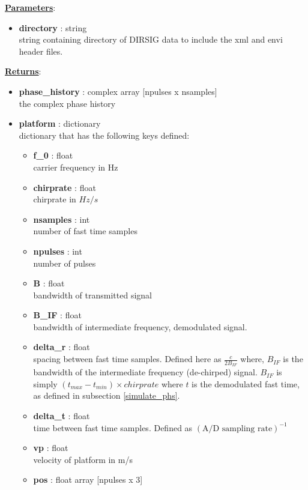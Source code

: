 \documentclass{article}
\newcommand{\defs}[2]{\textbf{{#1}} : {#2}}
\begin{document}
\noindent \underline{\textbf{Parameters}}:
\begin{itemize}
  	\item \defs{directory}{string}\\
  		string containing directory of DIRSIG data to include the xml and envi header files.
\end{itemize}
\noindent \underline{\textbf{Returns}}:
\begin{itemize}
	\item \defs{phase\_history}{complex array [npulses x nsamples]}\\
		the complex phase history
	  \item \defs{platform}{dictionary}\\
	  	dictionary that has the following keys defined:
	  \begin{itemize}
	    \item \defs{f\_0}{float}\\
	    	carrier frequency in Hz
		\item \defs{chirprate}{float}\\
		   	chirprate in $Hz/s$
	    \item \defs{nsamples}{int}\\
	    	number of fast time samples
	    \item \defs{npulses}{int}\\
	    	number of pulses
	    \item \defs{B}{float}\\
	    	bandwidth of transmitted signal
	    \item \defs{B\_IF}{float}\\
	    	bandwidth of intermediate frequency, demodulated signal.
	    \item \defs{delta\_r}{float}\\
       	   	spacing between fast time samples.  Defined here as $\frac{c}{2B_{IF}}$ where, $B_{IF}$ is the bandwidth of the intermediate frequency (de-chirped) signal.  $B_{IF}$ is simply $(t_{max}-t_{min})\times chirprate$ where $t$ is the demodulated fast time, as defined in subsection \ref{simulate_phs}.
    	\item \defs{delta\_t}{float}\\
    		time between fast time samples.  Defined as $(\mbox{A/D sampling rate})^{-1}$
    	\item \defs{vp}{float}\\
	   		velocity of platform in m/s
	   	\item \defs{pos}{float array [npulses x 3]}\\

\end{itemize}
\end{itemize}
\end{document}
